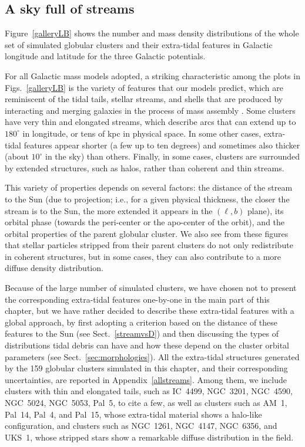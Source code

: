     \subsection{A sky full of streams}\label{results1}

    Figure~\ref{galleryLB} shows the number and mass density distributions of the whole set of simulated globular clusters and their extra-tidal features in Galactic longitude and latitude for the three Galactic potentials.

    For all Galactic mass models adopted, a striking characteristic among the plots in Figs.~\ref{galleryLB} is the variety of features that our models predict, which are reminiscent of the tidal tails, stellar streams, and shells that are produced by interacting and merging galaxies in the process of mass assembly \citep[see, e.g., ][]{2019A&A...632A.122M}. Some clusters have very thin and elongated streams, which describe arcs that can extend up to $180^\circ$ in longitude, or tens of kpc in physical space. In some other cases, extra-tidal features appear shorter (a few up to ten degrees) and sometimes also thicker (about $10^\circ$ in the sky) than others. Finally, in some cases, clusters are surrounded by extended structures, such as halos, rather than coherent and thin streams. 

    This variety of properties depends on several factors: the distance of the stream to the Sun (due to projection; i.e., for a given physical thickness, the closer the stream is to the Sun, the more extended it appears in the $(\ell, b)$ plane), its orbital phase (towards the peri-center or the apo-center of the orbit), and the orbital properties of the parent globular cluster. We also see from these figures that stellar particles stripped from their parent clusters do not only redistribute in coherent structures, but in some cases, they can also contribute to a more diffuse density distribution. 

    Because of the large number of simulated clusters, we have chosen not to present the corresponding extra-tidal features one-by-one in the main part of this chapter, but we have rather decided to describe these extra-tidal features with a global approach, by first adopting a criterion based on the distance of these features to the Sun (see Sect.~\ref{streamvsD}) and then discussing the types of distributions tidal debris can have and how these depend on the cluster orbital parameters (see Sect.~\ref{sec:morphologies}). All the extra-tidal structures generated by the 159 globular clusters simulated in this chapter, and their corresponding uncertainties, are reported in Appendix~\ref{allstreams}. Among them, we include clusters with thin and elongated tails, such as IC~4499, NGC~3201, NGC~4590, NGC~5024, NGC~5053, Pal~5, to cite a few, as well as clusters such as AM~1, Pal~14, Pal~4, and Pal~15, whose extra-tidal material shows a halo-like configuration, and clusters such as NGC~1261, NGC~4147, NGC~6356, and UKS~1, whose stripped stars show a remarkable diffuse distribution in the field. 

